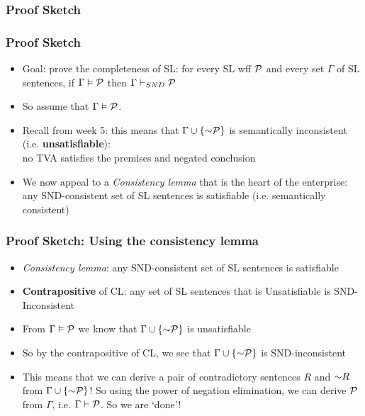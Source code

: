 \subsubsection{Proof Sketch}

\begin{frame}
\frametitle{Proof Sketch}

\begin{itemize}[<+->]

\item Goal: prove the completeness of SL: for every SL wff $\mathcal{P}$ and every set $\Gamma$ of SL sentences, if $\Gamma \vDash \mathcal{P}$ then $\Gamma \vdash_{SND} \mathcal{P}$

\item So assume that $\Gamma \vDash \mathcal{P}$. 

\item Recall from week 5: this means that $\Gamma \cup \{\enot \metav{P}\}$ is semantically inconsistent (i.e. \textbf{\textcolor{OGlyallpink}{unsatisfiable}}): \\ no TVA satisfies the premises and negated conclusion  

\item We now appeal to a \emph{Consistency lemma} that is the heart of the enterprise: any SND-consistent set of SL sentences is satisfiable (i.e. semantically consistent)

\end{itemize}
\end{frame}

\begin{frame}
\frametitle{Proof Sketch: Using the consistency lemma}

\begin{itemize}[<+->]

\item \emph{Consistency lemma}: any SND-consistent set of SL sentences is satisfiable

\item \textbf{\textcolor{OGlyallpink}{Contrapositive}} of CL: any set of SL sentences that is \textcolor{OGlyallpink}{Un}satisfiable is SND-\textcolor{OGlyallpink}{In}consistent

\item From  $\Gamma \vDash \mathcal{P}$ we know that $\Gamma \cup \{\enot \metav{P}\}$ is unsatisfiable

\item So by the contrapositive of CL, we see that $\Gamma \cup \{\enot \metav{P}\}$ is SND-inconsistent

\item This means that we can derive a pair of contradictory sentences $R$ and $\enot R$ from $\Gamma \cup \{\enot \metav{P}\}$! So using the power of negation elimination, we can derive $\mathcal{P}$ from $\Gamma$, i.e. $\Gamma \vdash \mathcal{P}$. So we are `done'! 

\end{itemize}
\end{frame}

